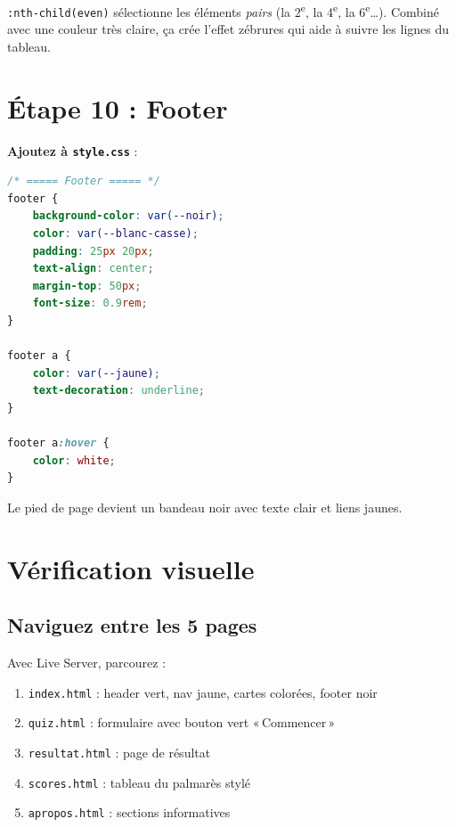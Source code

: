 \documentclass[11pt,a4paper]{article}
\newcommand{\cmark}{\ding{51}}
\begin{document}
\begin{infobox}
\texttt{:nth-child(even)} sélectionne les éléments \emph{pairs} (la 2\textsuperscript{e}, la 4\textsuperscript{e}, la 6\textsuperscript{e}\ldots). Combiné avec une couleur très claire, ça crée l'effet \og{}zébrures\fg{} qui aide à suivre les lignes du tableau.
\end{infobox}

\section{Étape 10 : Footer}

\textbf{Ajoutez à \texttt{style.css}} :

\begin{lstlisting}[language=CSS]
/* ===== Footer ===== */
footer {
    background-color: var(--noir);
    color: var(--blanc-casse);
    padding: 25px 20px;
    text-align: center;
    margin-top: 50px;
    font-size: 0.9rem;
}

footer a {
    color: var(--jaune);
    text-decoration: underline;
}

footer a:hover {
    color: white;
}
\end{lstlisting}

Le pied de page devient un bandeau noir avec texte clair et liens jaunes. \cmark

\newpage

\section{Vérification visuelle}

\subsection{Naviguez entre les 5 pages}

Avec Live Server, parcourez :
\begin{enumerate}[nosep]
    \item \texttt{index.html} : header vert, nav jaune, cartes colorées, footer noir
    \item \texttt{quiz.html} : formulaire avec bouton vert «\,Commencer\,»
    \item \texttt{resultat.html} : page de résultat
    \item \texttt{scores.html} : tableau du palmarès stylé
    \item \texttt{apropos.html} : sections informatives
\end{enumerate}
\end{document}

